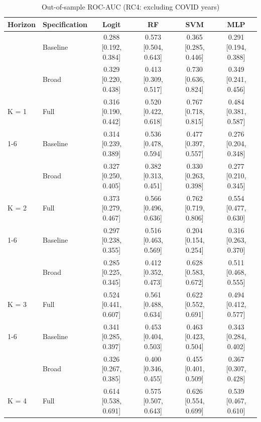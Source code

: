 \begin{table}

\caption{\label{tab:roc_ci_rc4}Out-of-sample ROC-AUC (RC4: excluding COVID years)}
\centering
\begin{tabular}[t]{llcccc}
\toprule
Horizon & Specification & Logit & RF & SVM & MLP\\
\midrule
 & Baseline & 0.288 [0.192, 0.384] & 0.573 [0.504, 0.643] & 0.365 [0.285, 0.446] & 0.291 [0.194, 0.388]\\

 & Broad & 0.329 [0.220, 0.438] & 0.413 [0.309, 0.517] & 0.730 [0.636, 0.824] & 0.349 [0.241, 0.456]\\

\multirow[t]{-2}{*}[\normalbaselineskip]{\raggedright\arraybackslash K = 1} & Full & 0.316 [0.190, 0.442] & 0.520 [0.422, 0.618] & 0.767 [0.718, 0.815] & 0.484 [0.381, 0.587]\\
\cmidrule{1-6}
 & Baseline & 0.314 [0.239, 0.389] & 0.536 [0.478, 0.594] & 0.477 [0.397, 0.557] & 0.276 [0.204, 0.348]\\

 & Broad & 0.327 [0.250, 0.405] & 0.382 [0.313, 0.451] & 0.330 [0.263, 0.398] & 0.277 [0.210, 0.345]\\

\multirow[t]{-2}{*}[\normalbaselineskip]{\raggedright\arraybackslash K = 2} & Full & 0.373 [0.279, 0.467] & 0.566 [0.496, 0.636] & 0.762 [0.719, 0.806] & 0.554 [0.477, 0.630]\\
\cmidrule{1-6}
 & Baseline & 0.297 [0.238, 0.355] & 0.516 [0.463, 0.569] & 0.204 [0.154, 0.254] & 0.316 [0.263, 0.370]\\

 & Broad & 0.285 [0.225, 0.345] & 0.412 [0.352, 0.473] & 0.628 [0.583, 0.672] & 0.511 [0.468, 0.555]\\

\multirow[t]{-2}{*}[\normalbaselineskip]{\raggedright\arraybackslash K = 3} & Full & 0.524 [0.441, 0.607] & 0.561 [0.488, 0.634] & 0.622 [0.552, 0.691] & 0.494 [0.412, 0.577]\\
\cmidrule{1-6}
 & Baseline & 0.341 [0.285, 0.397] & 0.453 [0.404, 0.503] & 0.463 [0.423, 0.504] & 0.343 [0.284, 0.402]\\

 & Broad & 0.326 [0.267, 0.385] & 0.400 [0.346, 0.455] & 0.455 [0.401, 0.509] & 0.367 [0.307, 0.428]\\

\multirow[t]{-2}{*}[\normalbaselineskip]{\raggedright\arraybackslash K = 4} & Full & 0.614 [0.538, 0.691] & 0.575 [0.507, 0.643] & 0.626 [0.554, 0.699] & 0.539 [0.467, 0.610]\\
\bottomrule
\end{tabular}
\end{table}
